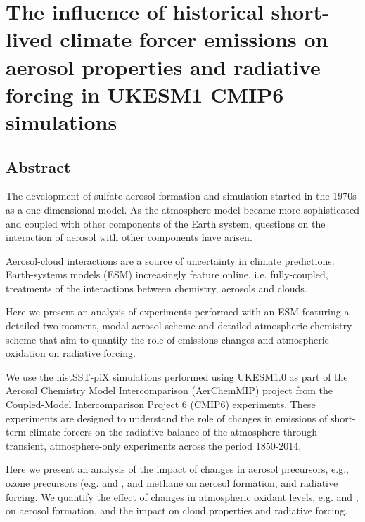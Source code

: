 \chapter{The influence of historical short-lived climate forcer emissions on aerosol properties and radiative forcing in UKESM1 CMIP6 simulations}
\label{ch3:title}
\ifpdf
    \graphicspath{{Chapter3/Figs/Raster/}{Chapter3/Figs/PDF/}{Chapter3/Figs/}}
\else
    \graphicspath{{Chapter3/Figs/Vector/}{Chapter3/Figs/}}
\fi

\section*{Abstract}

The development of sulfate aerosol formation and simulation started in the 1970s as a one-dimensional model. As the atmosphere model became more sophisticated and coupled with other components of the Earth system, questions on the interaction of aerosol with other components have arisen.

Aerosol-cloud interactions are a source of uncertainty in climate predictions. Earth-systems models (ESM) increasingly feature online, i.e. fully-coupled, treatments of the interactions between chemistry, aerosols and clouds.  


Here we present an analysis of experiments performed with an ESM featuring a detailed two-moment, modal aerosol scheme and detailed atmospheric chemistry scheme that aim to quantify the role of emissions changes and atmospheric oxidation on radiative forcing.

We use the histSST-piX simulations performed using UKESM1.0 as part of the  Aerosol Chemistry Model Intercomparison (AerChemMIP) project from the Coupled-Model Intercomparison Project 6 (CMIP6) experiments. These experiments are designed to understand the role of changes in emissions of short-term climate forcers on the radiative balance of the atmosphere through transient, atmosphere-only experiments across the period 1850-2014, 

Here we present an analysis of the impact of changes in aerosol precursors, e.g., ozone precursors (e.g.  and , and methane on aerosol formation, and radiative forcing. We quantify the effect of changes in atmospheric oxidant levels, e.g.  and , on aerosol formation, and the impact on cloud properties and radiative forcing.

